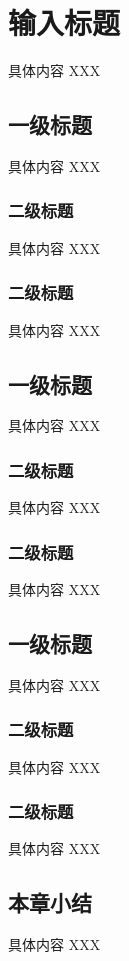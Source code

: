 \chapter{输入标题}
具体内容 XXX

\section{一级标题}

具体内容 XXX

\subsection{二级标题}

具体内容 XXX

\subsection{二级标题}

具体内容 XXX

\section{一级标题}

具体内容 XXX

\subsection{二级标题}

具体内容 XXX

\subsection{二级标题}

具体内容 XXX

\section{一级标题}

具体内容 XXX

\subsection{二级标题}

具体内容 XXX

\subsection{二级标题}

具体内容 XXX

\section{本章小结}
具体内容 XXX
